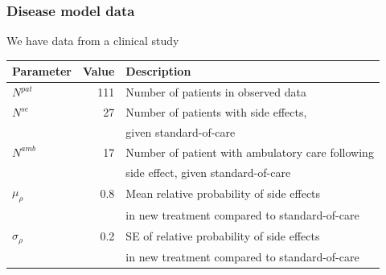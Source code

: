\begin{frame}

\end{frame}



\begin{frame}

\frametitle{Disease model data}

We have data from a clinical study


\begin{center}
\small
\begin{tabular}{lrl}
\hline
Parameter  & Value & Description\\
\hline
$N^{pat}$ & 111 & Number of patients in observed data \\
$N^{se}$  & 27  & Number of patients with side effects,  \\ &&given standard-of-care \\
$N^{amb}$ & 17  & Number of patient with ambulatory care following \\ &&side effect, given standard-of-care \\
$\mu_{\rho}$ & 0.8  & Mean relative probability of side effects \\ &&in new treatment compared to standard-of-care \\
$\sigma_{\rho}$ & 0.2  & SE of relative probability of side effects \\ &&in new treatment compared to standard-of-care \\
\hline

\end{tabular}
\end{center}
\end{frame}


